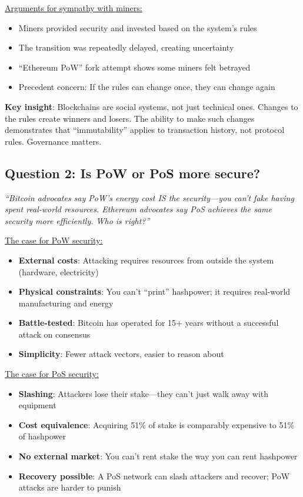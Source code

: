 \documentclass[11pt]{article}
\begin{document}
\medskip
\noindent\underline{Arguments for sympathy with miners:}
\begin{itemize}[leftmargin=*]
\item Miners provided security and invested based on the system's rules
\item The transition was repeatedly delayed, creating uncertainty
\item ``Ethereum PoW'' fork attempt shows some miners felt betrayed
\item Precedent concern: If the rules can change once, they can change again
\end{itemize}

\medskip
\noindent\textbf{Key insight}: Blockchains are social systems, not just technical ones. Changes to the rules create winners and losers. The ability to make such changes demonstrates that ``immutability'' applies to transaction history, not protocol rules. Governance matters.

\subsection*{Question 2: Is PoW or PoS more secure?}

\textit{``Bitcoin advocates say PoW's energy cost IS the security---you can't fake having spent real-world resources. Ethereum advocates say PoS achieves the same security more efficiently. Who is right?''}

\medskip
\noindent\underline{The case for PoW security:}
\begin{itemize}[leftmargin=*]
\item \textbf{External costs}: Attacking requires resources from outside the system (hardware, electricity)
\item \textbf{Physical constraints}: You can't ``print'' hashpower; it requires real-world manufacturing and energy
\item \textbf{Battle-tested}: Bitcoin has operated for 15+ years without a successful attack on consensus
\item \textbf{Simplicity}: Fewer attack vectors, easier to reason about
\end{itemize}

\medskip
\noindent\underline{The case for PoS security:}
\begin{itemize}[leftmargin=*]
\item \textbf{Slashing}: Attackers lose their stake---they can't just walk away with equipment
\item \textbf{Cost equivalence}: Acquiring 51\% of stake is comparably expensive to 51\% of hashpower
\item \textbf{No external market}: You can't rent stake the way you can rent hashpower
\item \textbf{Recovery possible}: A PoS network can slash attackers and recover; PoW attacks are harder to punish
\end{itemize}
\end{document}
